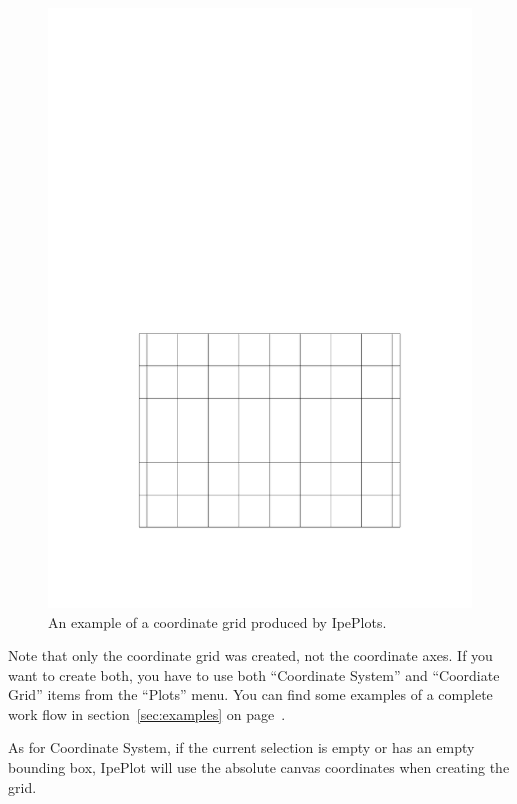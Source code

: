 \documentclass{article}
\begin{document}
\begin{figure}[h]
   \begin{center}
      \includegraphics[scale=.7]{coord_grid}
   \end{center}
   \caption{An example of a coordinate grid produced by IpePlots.}
   \label{fig:coord_grid}
\end{figure}

Note that only the coordinate grid was created, not the coordinate axes.  If
you want to create both, you have to use both ``Coordinate System'' and
``Coordiate Grid'' items from the ``Plots'' menu.  You can find some examples
of a complete work flow in section~\ref{sec:examples} on
page~\pageref{sec:examples}. 

As for Coordinate System, if the current selection is empty or has an empty
bounding box, IpePlot will use the absolute canvas coordinates when creating
the grid. 
\end{document}
